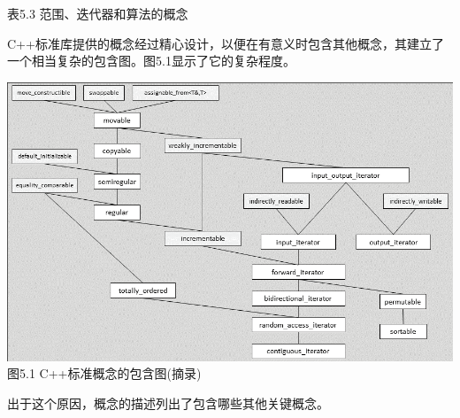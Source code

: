 \begin{center}
表5.3 范围、迭代器和算法的概念
\end{center}


C++标准库提供的概念经过精心设计，以便在有意义时包含其他概念，其建立了一个相当复杂的包含图。图5.1显示了它的复杂程度。

\begin{center}
\includegraphics[width=1.\textwidth]{content/chapter5/images/1.png}\\
图5.1 C++标准概念的包含图(摘录)
\end{center}

出于这个原因，概念的描述列出了包含哪些其他关键概念。




